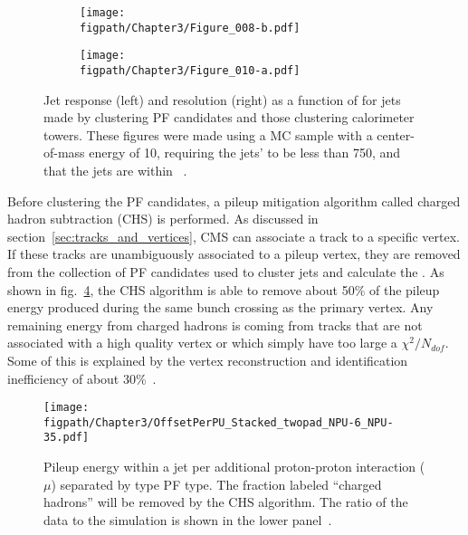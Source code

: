 \begin{figure}[!hbt]
    \centering
    \begin{subfigure}[t]{0.48\textwidth}
        \texttt{[image: \\figpath/Chapter3/Figure\_008-b.pdf]}
        \caption{}
        \label{fig:PFVsCaloJetResponse}
    \end{subfigure}
    \begin{subfigure}[t]{0.48\textwidth}
        \texttt{[image: \\figpath/Chapter3/Figure\_010-a.pdf]}
        \caption{}
        \label{fig:PFVsCaloJetResolution}
    \end{subfigure}
    \caption{Jet response (left) and resolution (right) as a function of \pt for jets made by clustering PF candidates and those clustering calorimeter towers. These figures were made using a MC sample with a center-of-mass energy of 10\tev, requiring the jets' \pt to be less than 750\gev, and that the jets are within ~\cite{CMS-PAS-PFT-09-001}.}
\end{figure}

Before clustering the PF candidates, a pileup mitigation algorithm called charged hadron subtraction (CHS) is performed. As discussed in section~\ref{sec:tracks_and_vertices}, CMS can associate a track to a specific vertex. If these tracks are unambiguously associated to a pileup vertex, they are removed from the collection of PF candidates used to cluster jets and calculate the \VETslash. As shown in fig.~\ref{fig:PFJet_PileupComposition}, the CHS algorithm is able to remove about 50\% of the pileup energy produced during the same bunch crossing as the primary vertex. Any remaining energy from charged hadrons is coming from tracks that are not associated with a high quality vertex or which simply have too large a $\chi^{2}/N_{dof}$. Some of this is explained by the vertex reconstruction and identification inefficiency of about 30\%~\cite{Khachatryan:2198719}.

\begin{figure}[!hbt]
    \centering
    \texttt{[image: \\figpath/Chapter3/OffsetPerPU\_Stacked\_twopad\_NPU-6\_NPU-35.pdf]}
    \caption{Pileup energy within a jet per additional proton-proton interaction ($\mu$) separated by type PF type. The fraction labeled ``charged hadrons'' will be removed by the CHS algorithm. The ratio of the data to the simulation is shown in the lower panel~\cite{Khachatryan:2198719}.}
    \label{fig:PFJet_PileupComposition}
\end{figure}

